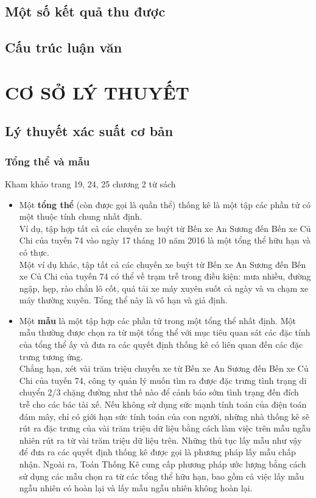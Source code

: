 \documentclass[a4paper, 13pt]{report}
\begin{document}
\section{Một số kết quả thu được}
\section{Cấu trúc luận văn}
\pagebreak
\chapter{CƠ SỞ LÝ THUYẾT}
\section{Lý thuyết xác suất cơ bản}
\subsection*{Tổng thể và mẫu}
Kham khảo trang 19, 24, 25 chương 2 từ sách \cite{TKCNUDR}
\begin{itemize}
\item Một \textbf{tổng thể} (còn được gọi là quần thể) thống kê là một tập các phần tử có một thuộc tính chung nhất định. 
\\Ví dụ, tập hợp tất cả các chuyến xe buýt từ Bến xe An Sương đến Bến xe Củ Chi của tuyến 74 vào ngày 17 tháng 10 năm 2016 là một tổng thể hữu hạn và có thực.\\
Một ví dụ khác, tập tất cả các chuyến xe buýt từ Bến xe An Sương đến Bến xe Củ Chi của tuyến 74 có thể về trạm trễ trong điều kiện: mưa nhiều, đường ngập, hẹp, rào chắn lô cốt, quá tải xe máy xuyên suốt cả ngày và va chạm xe máy thường xuyên. Tổng thể này là vô hạn và giả định.
\item Một \textbf{mẫu} là một tập hợp các phần tử trong một tổng thể nhất định. Một mẫu thường được chọn ra từ một tổng thể với mục tiêu quan sát các đặc tính của tổng thể ấy và đưa ra các quyết định thống kê có liên quan đến các đặc trưng tương ứng. \\
Chẳng hạn, xét vài trăm triệu chuyến xe từ Bến xe An Sương đến Bến xe Củ Chi của tuyến 74, công ty quản lý muốn tìm ra được đặc trưng tình trạng di chuyển 2/3 chặng đường như thế nào để cảnh báo sớm tình trạng đến đích trễ cho các bác tài xế. Nếu không sử dụng sức mạnh tính toán của điện toán đám mây, chỉ có giới hạn sức tính toán của con người, những nhà thống kê sẽ rút ra đặc trưng của vài trăm triệu dữ liệu bằng cách làm việc trên mẫu ngẫu nhiên rút ra từ vài trăm triệu dữ liệu trên. Những thủ tục lấy mẫu như vậy để đưa ra các quyết định thống kê được gọi là phương pháp lấy mẫu chấp nhận. Ngoài ra, Toán Thống Kê cung cấp phương pháp ước lượng bằng cách sử dụng các mẫu chọn ra từ các tổng thể hữu hạn, bao gồm cả việc lấy mẫu ngẫu nhiên có hoàn lại và lấy mẫu ngẫu nhiên không hoàn lại.\\
\end{itemize}
\end{document}

